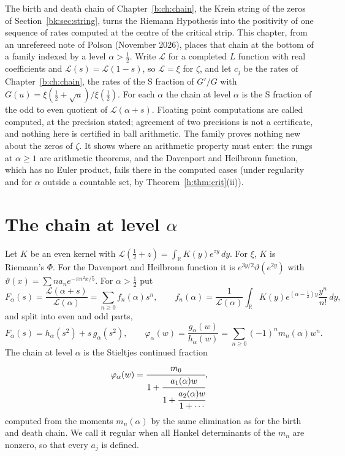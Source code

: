 \label{h:ch:chains}

\ifdefined\conjecture\else\theoremstyle{sc}\newtheorem{conjecture}[theorem]{Conjecture}\theoremstyle{scr}\fi
\ifdefined\computation\else\theoremstyle{sc}\newtheorem{computation}[theorem]{Computation}\theoremstyle{scr}\fi

The birth and death chain of Chapter~\ref{b:ch:chain}, the Krein string of the zeros of Section~\ref{bk:sec:string}, turns the Riemann Hypothesis into the positivity of one sequence of rates computed at the centre of the critical strip. This chapter, from an unrefereed note of Polson (November 2026), places that chain at the bottom of a family indexed by a level $\alpha>\frac12$. Write $\mathcal L$ for a completed $L$ function with real coefficients and $\mathcal L(s)=\mathcal L(1-s)$, so $\mathcal L=\xi$ for $\zeta$, and let $c_j$ be the rates of Chapter~\ref{b:ch:chain}, the rates of the S fraction of $G'/G$ with $G(u)=\xi(\frac12+\sqrt u)/\xi(\frac12)$. For each $\alpha$ the chain at level $\alpha$ is the S fraction of the odd to even quotient of $\mathcal L(\alpha+s)$.
Floating point computations are called computed, at the precision stated; agreement of two precisions is not a certificate, and nothing here is certified in ball arithmetic. The family proves nothing new about the zeros of $\zeta$. It shows where an arithmetic property must enter: the rungs at $\alpha\ge1$ are arithmetic theorems, and the Davenport and Heilbronn function, which has no Euler product, fails there in the computed cases (under regularity and for $\alpha$ outside a countable set, by Theorem~\ref{h:thm:crit}(ii)).

\section{The chain at level $\alpha$}

Let $K$ be an even kernel with $\mathcal L(\frac12+z)=\int_{\mathbb R}K(y)e^{zy}\,dy$. For $\xi$, $K$ is Riemann's $\Phi$. For the Davenport and Heilbronn function it is $e^{3y/2}\vartheta(e^{2y})$ with $\vartheta(x)=\sum na_ne^{-\pi n^2x/5}$. For $\alpha>\frac12$ put
\[
F_\alpha(s)=\frac{\mathcal L(\alpha+s)}{\mathcal L(\alpha)}=\sum_{n\ge0}f_n(\alpha)s^n,\qquad f_n(\alpha)=\frac{1}{\mathcal L(\alpha)}\int_{\mathbb R}K(y)e^{(\alpha-\frac12)y}\frac{y^n}{n!}\,dy,
\]
and split into even and odd parts,
\[
F_\alpha(s)=h_\alpha(s^2)+s\,g_\alpha(s^2),\qquad \varphi_\alpha(w)=\frac{g_\alpha(w)}{h_\alpha(w)}=\sum_{n\ge0}(-1)^nm_n(\alpha)w^n .
\]
The chain at level $\alpha$ is the Stieltjes continued fraction
\[
\varphi_\alpha(w)=\cfrac{m_0}{1+\cfrac{a_1(\alpha)w}{1+\cfrac{a_2(\alpha)w}{1+\cdots}}},
\]
computed from the moments $m_n(\alpha)$ by the same elimination as for the birth and death chain. We call it regular when all Hankel determinants of the $m_n$ are nonzero, so that every $a_j$ is defined.

